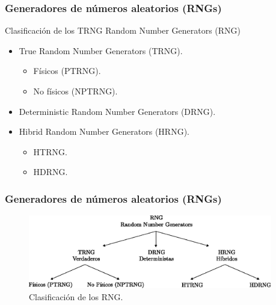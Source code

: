 \documentclass[10pt]{beamer}
\begin{document}
\begin{frame}
    \frametitle{Generadores de números aleatorios (RNGs)}
    \begin{block}{Clasificación de los TRNG}
        \justifying
        Random Number Generators (RNG)
        \begin{itemize}
            \item True Random Number Generators (TRNG).
            \begin{itemize}
                \item Físicos (PTRNG).
                \item No físicos (NPTRNG).
            \end{itemize}
            \item Deterministic Random Number Generators (DRNG).
            \item Hibrid Random Number Generators (HRNG).
            \begin{itemize}
                \item HTRNG.
                \item HDRNG.
            \end{itemize}
        \end{itemize}
	\end{block}
\end{frame}



\begin{frame}
    \frametitle{Generadores de números aleatorios (RNGs)}
	\begin{figure}[hbtp]
	    \centering
	    \includegraphics[width=0.95\textwidth]{K0_clasificacion}
	    \caption{Clasificación de los RNG.}
        \label{fig:K0_clasificacion}
    \end{figure}
\end{frame}
\end{document}

